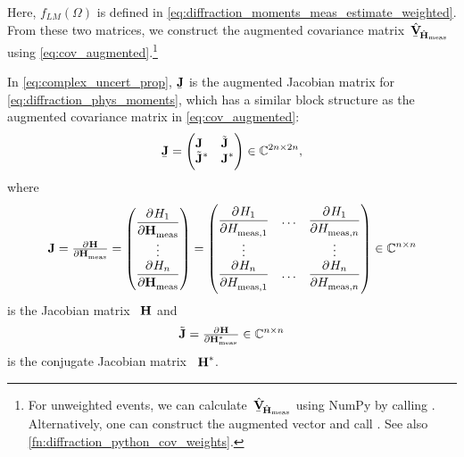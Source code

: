Here, $f_{L M}(\Omega)$ is defined in
\cref{eq:diffraction_moments_meas_estimate_weighted}.  From these two
matrices, we construct the augmented covariance
matrix~$\hat{\underaccent{\bar}{\covMatSym}}_{\!\hat{\vect{H}}_\text{meas}}$
using \cref{eq:cov_augmented}.\footnote{\label{fn:cov_aug_numpy} For
unweighted events, we can
calculate~$\hat{\underaccent{\bar}{\covMatSym}}_{\!\hat{\vect{H}}_\text{meas}}$
using NumPy by calling .  Alternatively, one can construct the augmented
vector  and
call .  See also
\cref{fn:diffraction_python_cov_weights}.}

In \cref{eq:complex_uncert_prop}, $\underaccent{\bar}{\mat{J}}$ is the
augmented Jacobian matrix for \cref{eq:diffraction_phys_moments}, which
has a similar block structure as the augmented covariance matrix in
\cref{eq:cov_augmented}:
\begin{equation}
  \label{eq:J_augmented}
  \underaccent{\bar}{\mat{J}}
  = \begin{pmatrix*}[l]
    \mat{J} & \tilde{\mat{J}} \\
    \tilde{\mat{J}}^* & \mat{J}^*
  \end{pmatrix*}
  \in \mathbb{C}^{2n \times 2n},
\end{equation}
where
\begin{equation}
  \mat{J}
  = \pd{\vect{H}}{\vect{H}_\text{meas}}
  = \begin{pmatrix}
    \dpd{H_1}{\vect{H}_\text{meas}} \\
    \vdots \\
    \dpd{H_n}{\vect{H}_\text{meas}}
  \end{pmatrix}
  = \begin{pmatrix}
    \dpd{H_1}{H_{\text{meas}, 1}} & \ldots & \dpd{H_1}{H_{\text{meas}, n}} \\
    \vdots & & \vdots \\
    \dpd{H_n}{H_{\text{meas}, 1}} & \ldots & \dpd{H_n}{H_{\text{meas}, n}}
  \end{pmatrix}
  \in \mathbb{C}^{n \times n}
\end{equation}
is the Jacobian matrix \wrt~$\bm{\mathrm{H}}$ and
\begin{equation}
  \tilde{\mat{J}}
  = \pd{\vect{H}}{{\vect{H}_\text{meas}^*}}
  \in \mathbb{C}^{n \times n}
\end{equation}
is the conjugate Jacobian matrix \wrt~$\bm{\mathrm{H}}^*$.

